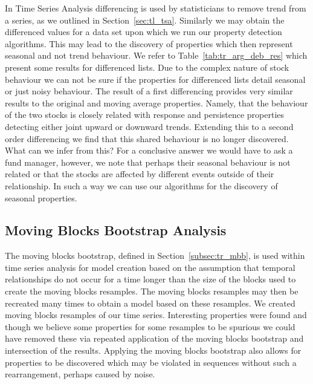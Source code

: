 In Time Series Analysis differencing is used by statisticians to
remove trend from a series, as we outlined in Section~\ref{sec:tl_tsa}.
Similarly we may obtain the differenced values for a data set upon
which we run our property detection algorithms. This may lead to the
discovery of properties which then represent seasonal and not trend
behaviour. We refer to Table~\ref{tab:tr_arg_deb_res} which
present some results for differenced lists. Due to the complex nature
of stock behaviour we can not be sure if the properties for
differenced lists detail seasonal or just noisy behaviour. The result
of a first differencing provides very similar results to the original
and moving average properties. Namely, that the behaviour of the two
stocks is closely related with response and persistence properties
detecting either joint upward or downward trends. Extending this to a
second order differencing we find that this shared behaviour is no
longer discovered. What can we infer from this?  For a conclusive
answer we would have to ask a fund manager, however, we note
that perhaps their seasonal behaviour is not related or that the
stocks are affected by different events outside of their
relationship. In such a way we can use our algorithms for the
discovery of seasonal properties.


\subsection{Moving Blocks Bootstrap Analysis}\label{subsec:tr_mbb_analysis}

The moving blocks bootstrap, defined in Section~\ref{subsec:tr_mbb},
is used within time series analysis for model creation based on the
assumption that temporal relationships do not occur for a time longer
than the size of the blocks used to create the moving blocks
resamples. The moving blocks resamples may then be recreated many
times to obtain a model based on these resamples. We created moving
blocks resamples of our time series. Interesting properties were found
and though we believe some properties for some resamples to be
spurious we could have removed these via repeated application of the
moving blocks bootstrap and intersection of the results.
Applying the moving blocks bootstrap also allows for properties to be
discovered which may be violated in sequences without such a
rearrangement, perhaps caused by noise.

\medskip

